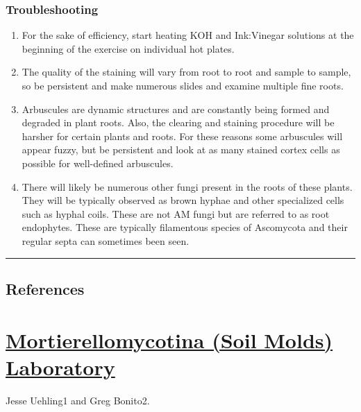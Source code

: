 \documentclass[]{book}
\providecommand{\tightlist}{%
  \setlength{\itemsep}{0pt}\setlength{\parskip}{0pt}}
\begin{document}
\hypertarget{troubleshooting-1}{%
\subsection{Troubleshooting}\label{troubleshooting-1}}

\begin{enumerate}
\def\labelenumi{\arabic{enumi}.}
\tightlist
\item
  For the sake of efficiency, start heating KOH and Ink:Vinegar solutions at the beginning of the exercise on individual hot plates.
\item
  The quality of the staining will vary from root to root and sample to sample, so be persistent and make numerous slides and examine multiple fine roots.
\item
  Arbuscules are dynamic structures and are constantly being formed and degraded in plant roots. Also, the clearing and staining procedure will be harsher for certain plants and roots. For these reasons some arbuscules will appear fuzzy, but be persistent and look at as many stained cortex cells as possible for well-defined arbuscules.
\item
  There will likely be numerous other fungi present in the roots of these plants. They will be typically observed as brown hyphae and other specialized cells such as hyphal coils. These are not AM fungi but are referred to as root endophytes. These are typically filamentous species of Ascomycota and their regular septa can sometimes been seen.
\end{enumerate}

\begin{center}\rule{0.5\linewidth}{\linethickness}\end{center}

\hypertarget{references-5}{%
\section{References}\label{references-5}}

\hypertarget{Mortierellomycotina}{%
\chapter{\texorpdfstring{\href{https://mycorrhizas.info/download/pdf/3_9.pdf}{Mortierellomycotina (Soil Molds) Laboratory}}{Mortierellomycotina (Soil Molds) Laboratory}}\label{Mortierellomycotina}}

Jesse Uehling1 and Greg Bonito2.
\end{document}
